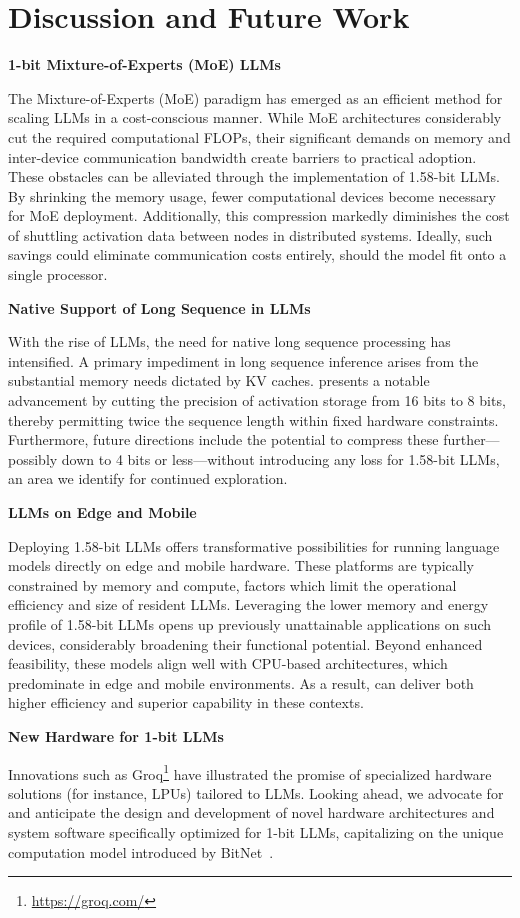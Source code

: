 \section{Discussion and Future Work}

\textbf{1-bit Mixture-of-Experts (MoE) LLMs}

The Mixture-of-Experts (MoE) paradigm has emerged as an efficient method for scaling LLMs in a cost-conscious manner. While MoE architectures considerably cut the required computational FLOPs, their significant demands on memory and inter-device communication bandwidth create barriers to practical adoption. These obstacles can be alleviated through the implementation of 1.58-bit LLMs. By shrinking the memory usage, fewer computational devices become necessary for MoE deployment. Additionally, this compression markedly diminishes the cost of shuttling activation data between nodes in distributed systems. Ideally, such savings could eliminate communication costs entirely, should the model fit onto a single processor.

\textbf{Native Support of Long Sequence in LLMs}

With the rise of LLMs, the need for native long sequence processing has intensified. A primary impediment in long sequence inference arises from the substantial memory needs dictated by KV caches.  presents a notable advancement by cutting the precision of activation storage from 16 bits to 8 bits, thereby permitting twice the sequence length within fixed hardware constraints. Furthermore, future directions include the potential to compress these further—possibly down to 4 bits or less—without introducing any loss for 1.58-bit LLMs, an area we identify for continued exploration.

\textbf{LLMs on Edge and Mobile}

Deploying 1.58-bit LLMs offers transformative possibilities for running language models directly on edge and mobile hardware. These platforms are typically constrained by memory and compute, factors which limit the operational efficiency and size of resident LLMs. Leveraging the lower memory and energy profile of 1.58-bit LLMs opens up previously unattainable applications on such devices, considerably broadening their functional potential. Beyond enhanced feasibility, these models align well with CPU-based architectures, which predominate in edge and mobile environments. As a result,  can deliver both higher efficiency and superior capability in these contexts.

\textbf{New Hardware for 1-bit LLMs}

Innovations such as Groq\footnote{\url{https://groq.com/}} have illustrated the promise of specialized hardware solutions (for instance, LPUs) tailored to LLMs. Looking ahead, we advocate for and anticipate the design and development of novel hardware architectures and system software specifically optimized for 1-bit LLMs, capitalizing on the unique computation model introduced by BitNet~\cite{bitnet}.